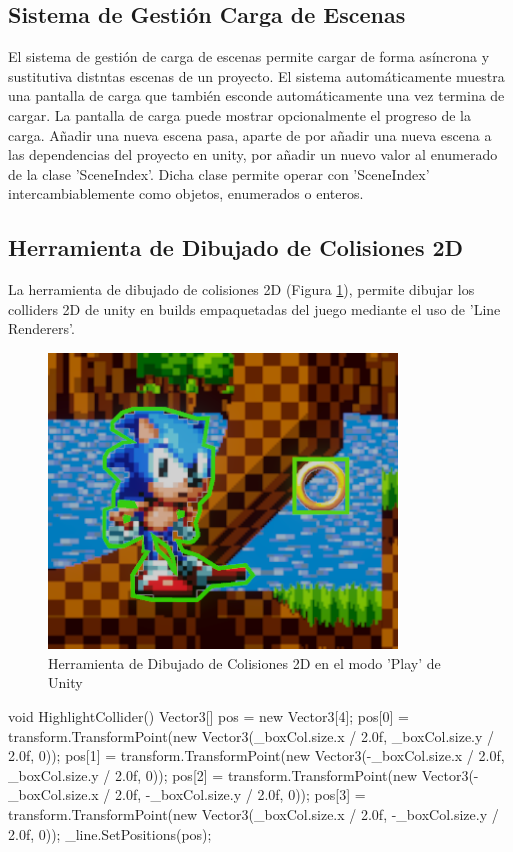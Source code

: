 \subsection{Sistema de Gestión Carga de Escenas}
El sistema de gestión de carga de escenas permite cargar de forma asíncrona y sustitutiva distntas escenas de un proyecto. El sistema automáticamente muestra una 
pantalla de carga que también esconde automáticamente una vez termina de cargar. La pantalla de carga puede mostrar opcionalmente el progreso de la carga. Añadir una nueva
 escena pasa, aparte de por añadir una nueva escena a las dependencias del proyecto en unity, por añadir un nuevo valor al enumerado de la clase 'SceneIndex'. Dicha clase 
 permite operar con 'SceneIndex' intercambiablemente como objetos, enumerados o enteros.

\subsection{Herramienta de Dibujado de Colisiones 2D}
La herramienta de dibujado de colisiones 2D (Figura \ref{fig:debug2d}), permite dibujar los colliders 2D de unity en builds empaquetadas del juego mediante el uso de
 'Line Renderers'. 

\begin{figure}[H]
  \centering
    \includegraphics[width=350px,clip=true]{debug2d.png}
  \caption{Herramienta de Dibujado de Colisiones 2D en el modo 'Play' de Unity}
  \label{fig:debug2d}
\end{figure}

\begin{mypython}[caption={Algoritmo para pintar un box collider 2D.},label={alg:debugbox2d}]
    void HighlightCollider()
    {
        Vector3[] pos = new Vector3[4];
        pos[0] = transform.TransformPoint(new Vector3(_boxCol.size.x / 2.0f, _boxCol.size.y / 2.0f, 0));
        pos[1] = transform.TransformPoint(new Vector3(-_boxCol.size.x / 2.0f, _boxCol.size.y / 2.0f, 0));
        pos[2] = transform.TransformPoint(new Vector3(-_boxCol.size.x / 2.0f, -_boxCol.size.y / 2.0f, 0));
        pos[3] = transform.TransformPoint(new Vector3(_boxCol.size.x / 2.0f, -_boxCol.size.y / 2.0f, 0));
        _line.SetPositions(pos);
    }
\end{mypython}

